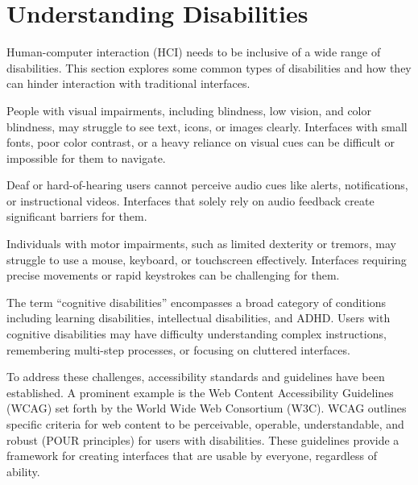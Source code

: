 \section{Understanding Disabilities}

Human-computer interaction (HCI) needs to be inclusive of a wide range of
disabilities. This section explores some common types of disabilities and how
they can hinder interaction with traditional interfaces.

People with visual impairments, including blindness, low vision, and color
blindness, may struggle to see text, icons, or images clearly. Interfaces with
small fonts, poor color contrast, or a heavy reliance on visual cues can be
difficult or impossible for them to navigate.

Deaf or hard-of-hearing users cannot perceive audio cues like alerts,
notifications, or instructional videos. Interfaces that solely rely on audio
feedback create significant barriers for them.

Individuals with motor impairments, such as limited dexterity or tremors, may
struggle to use a mouse, keyboard, or touchscreen effectively. Interfaces
requiring precise movements or rapid keystrokes can be challenging for them.

The term ``cognitive disabilities'' encompasses a broad category of conditions
including learning disabilities, intellectual disabilities, and ADHD. Users with
cognitive disabilities may have difficulty understanding complex instructions,
remembering multi-step processes, or focusing on cluttered interfaces.

To address these challenges, accessibility standards and guidelines have been
established. A prominent example is the Web Content Accessibility Guidelines
(WCAG) set forth by the World Wide Web Consortium (W3C). WCAG outlines specific
criteria for web content to be perceivable, operable, understandable, and robust
(POUR principles) for users with disabilities. These guidelines provide a
framework for creating interfaces that are usable by everyone, regardless of
ability.
